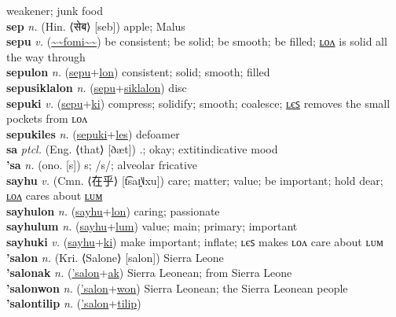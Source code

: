 weakener; junk food \label{setlukiles} \\
\textbf{sep} \textit{n.} (Hin. ⟨सेब⟩ [seb])
apple; Malus \label{sep} \\
\textbf{sepu} \textit{v.} (\hyperref[fomi]{\~{}\~{}fomi\~{}\~{}})
be consistent; be solid; be smooth; be filled; \hyperref[sepulon]{ʟᴏᴧ} is solid all the way through \label{sepu} \\
\textbf{sepulon} \textit{n.} (\hyperref[sepu]{sepu}+\hyperref[lon]{lon})
consistent; solid; smooth; filled \label{sepulon} \\
\textbf{sepusiklalon} \textit{n.} (\hyperref[sepu]{sepu}+\hyperref[siklalon]{siklalon})
disc \label{sepusiklalon} \\
\textbf{sepuki} \textit{v.} (\hyperref[sepu]{sepu}+\hyperref[ki]{ki})
compress; solidify; smooth; coalesce; \hyperref[sepukiles]{ʟєꜱ} removes the small pockets from ʟᴏᴧ \label{sepuki} \\
\textbf{sepukiles} \textit{n.} (\hyperref[sepuki]{sepuki}+\hyperref[les]{les})
defoamer \label{sepukiles} \\
\textbf{sa} \textit{ptcl.} (Eng. ⟨that⟩ [ðæt])
.; okay; 	extit{indicative mood} \label{sa} \\
\textbf{'sa} \textit{n.} (ono. [s])
s; /s/; alveolar fricative \label{'sa} \\
\textbf{sayhu} \textit{v.} (Cmn. ⟨在乎⟩ [t͡saɪ̯˥˩xu])
care; matter; value; be important; hold dear; \hyperref[sayhulon]{ʟᴏᴧ} cares about \hyperref[sayhulum]{ʟᴜᴍ} \label{sayhu} \\
\textbf{sayhulon} \textit{n.} (\hyperref[sayhu]{sayhu}+\hyperref[lon]{lon})
caring; passionate \label{sayhulon} \\
\textbf{sayhulum} \textit{n.} (\hyperref[sayhu]{sayhu}+\hyperref[lum]{lum})
value; main; primary; important \label{sayhulum} \\
\textbf{sayhuki} \textit{v.} (\hyperref[sayhu]{sayhu}+\hyperref[ki]{ki})
make important; inflate; ʟєꜱ makes ʟᴏᴧ care about ʟᴜᴍ \label{sayhuki} \\
\textbf{'salon} \textit{n.} (Kri. ⟨Salone⟩ [salon])
Sierra Leone \label{'salon} \\
\textbf{'salonak} \textit{n.} (\hyperref['salon]{'salon}+\hyperref[ak]{ak})
Sierra Leonean; from Sierra Leone \label{'salonak} \\
\textbf{'salonwon} \textit{n.} (\hyperref['salon]{'salon}+\hyperref[won]{won})
Sierra Leonean; the Sierra Leonean people \label{'salonwon} \\
\textbf{'salontilip} \textit{n.} (\hyperref['salon]{'salon}+\hyperref[tilip]{tilip})
